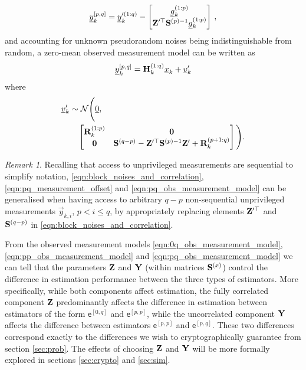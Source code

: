 \documentclass[conference]{IEEEtran}
\theoremstyle{definition}
\theoremstyle{remark}
\newtheorem*{remark}{Remark}
\begin{document}
\begin{LaTeXdescription}
  \begin{equation}\label{eqn:pq_measurement_offset}
    \vec{y}_k^{[p,q]}=\vec{y}_k^{\prime(1:q)} - 
    \begin{bmatrix}
      \vec{g}_k^{(1:p)}\\
      \mat{Z}^{\prime\top}\mat{S}^{(p)-1}\vec{g}_k^{(1:p)}
    \end{bmatrix}\,,
  \end{equation}
  and accounting for unknown pseudorandom noises being indistinguishable from random, a zero-mean observed measurement model can be written as
  \begin{equation}\label{eqn:pq_obs_measurement_model}
    \vec{y}_k^{[p,q]} = \mat{H}_k^{(1:q)}\vec{x}_k + \vec{v}_k^{\prime}
  \end{equation}
  where 
  \begin{equation*}
    \begin{split}
      &{\underline{v}}_k^{\prime} \sim \mathcal{N}\Bigg({\underline{0}},\\
      &\qquad 
      \begin{bmatrix}
        {\ensuremath{{\mathbf{R}}}}_k^{(1:p)} & {{\mathbf{0}}}\\
        {{\mathbf{0}}} & {{\mathbf{S}}}^{(q-p)} - {{\mathbf{Z}}}^{\prime\top}{{\mathbf{S}}}^{(p)-1}{{\mathbf{Z}}}^{\prime} + {{\mathbf{R}}}_k^{(p+1:q)}
      \end{bmatrix}\Bigg).
    \end{split}
  \end{equation*}
\end{LaTeXdescription}
\begin{remark}
  Recalling that access to unprivileged measurements are sequential to simplify notation, \eqref{eqn:block_noises_and_correlation}, \eqref{eqn:pq_measurement_offset} and \eqref{eqn:pq_obs_measurement_model} can be generalised when having access to arbitrary $q-p$ non-sequential unprivileged measurements $\vec{y}_{k,i}$, $p<i\leq q$, by appropriately replacing elements ${{\mathbf{Z}}}^{\prime\top}$ and ${{\mathbf{S}}}^{(q-p)}$ in \eqref{eqn:block_noises_and_correlation}.
\end{remark}

From the observed measurement models \eqref{eqn:0q_obs_measurement_model}, \eqref{eqn:pp_obs_measurement_model} and \eqref{eqn:pq_obs_measurement_model} we can tell that the parameters ${{\mathbf{Z}}}$ and ${{\mathbf{Y}}}$ (within matrices ${{\mathbf{S}}}^{(x)}$) control the difference in estimation performance between the three types of estimators. More specifically, while both components affect estimation, the fully correlated component ${{\mathbf{Z}}}$ predominantly affects the difference in estimation between estimators of the form $\mathsf{e}^{[0,q]}$ and $\mathsf{e}^{[p,p]}$, while the uncorrelated component ${{\mathbf{Y}}}$ affects the difference between estimators $\mathsf{e}^{[p,p]}$ and $\mathsf{e}^{[p,q]}$. These two differences correspond exactly to the differences we wish to cryptographically guarantee from section \ref{sec:prob}. The effects of choosing ${{\mathbf{Z}}}$ and ${{\mathbf{Y}}}$ will be more formally explored in sections \ref{sec:crypto} and \ref{sec:sim}.
\end{document}

